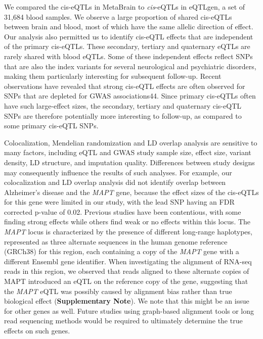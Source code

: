 We compared the cis-eQTLs in MetaBrain to \emph{cis}-eQTLs in eQTLgen, a set of 31,684 blood samples. We observe a large proportion of shared cis-eQTLs between brain and blood, most of which have the same allelic direction of effect. Our analysis also permitted us to identify cis-eQTL effects that are independent of the primary cis-eQTLs. These secondary, tertiary and quaternary eQTLs are rarely shared with blood eQTLs. Some of these independent effects reflect SNPs that are also the index variants for several neurological and psychiatric disorders, making them particularly interesting for subsequent follow-up. Recent observations have revealed that strong cis-eQTL effects are often observed for SNPs that are depleted for GWAS associations44. Since primary cis-eQTLs often have such large-effect sizes, the secondary, tertiary and quaternary cis-eQTL SNPs are therefore potentially more interesting to follow-up, as compared to some primary cis-eQTL SNPs. 

Colocalization, Mendelian randomization and LD overlap analysis are sensitive to many factors, including eQTL and GWAS study sample size, effect size, variant density, LD structure, and imputation quality. Differences between study designs may consequently influence the results of such analyses. For example, our colocalization and LD overlap analysis did not identify overlap between Alzheimer’s disease and the \emph{MAPT} gene, because the effect sizes of the cis-eQTLs for this gene were limited in our study, with the lead SNP having an FDR corrected p-value of 0.02. Previous studies have been contentious, with some finding strong effects\cite{wangComprehensiveFunctionalGenomic2018,ngXQTLMapIntegrates2017} while others find weak or no effects within this locus\cite{aguetGeneticEffectsGene2017,siebertsLargeEQTLMetaanalysis2020}. The \emph{MAPT} locus is characterized by the presence of different long-range haplotypes, represented as three alternate sequences in the human genome reference (GRCh38) for this region, each containing a copy of the \emph{MAPT} gene with a different Ensembl gene identifier. When investigating the alignment of RNA-seq reads in this region, we observed that reads aligned to these alternate copies of MAPT introduced an eQTL on the reference copy of the gene, suggesting that the \emph{MAPT} eQTL was possibly caused by alignment bias rather than true biological effect (\textbf{Supplementary Note}). We note that this might be an issue for other genes as well. Future studies using graph-based alignment tools or long read sequencing methods would be required to ultimately determine the true effects on such genes. 


